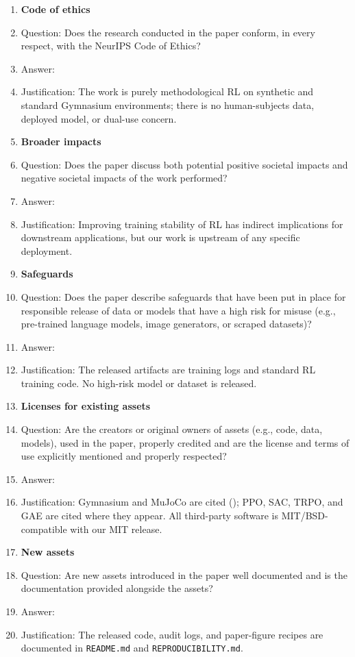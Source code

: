 \begin{enumerate}
\item {\bf Code of ethics}
    \item[] Question: Does the research conducted in the paper conform, in every respect, with the NeurIPS Code of Ethics?
    \item[] Answer: \answerYes{}
    \item[] Justification: The work is purely methodological RL on synthetic and standard Gymnasium environments; there is no human-subjects data, deployed model, or dual-use concern.

\item {\bf Broader impacts}
    \item[] Question: Does the paper discuss both potential positive societal impacts and negative societal impacts of the work performed?
    \item[] Answer: \answerNA{}
    \item[] Justification: Improving training stability of RL has indirect implications for downstream applications, but our work is upstream of any specific deployment.

\item {\bf Safeguards}
    \item[] Question: Does the paper describe safeguards that have been put in place for responsible release of data or models that have a high risk for misuse (e.g., pre-trained language models, image generators, or scraped datasets)?
    \item[] Answer: \answerNA{}
    \item[] Justification: The released artifacts are training logs and standard RL training code. No high-risk model or dataset is released.

\item {\bf Licenses for existing assets}
    \item[] Question: Are the creators or original owners of assets (e.g., code, data, models), used in the paper, properly credited and are the license and terms of use explicitly mentioned and properly respected?
    \item[] Answer: \answerYes{}
    \item[] Justification: Gymnasium and MuJoCo are cited (); PPO, SAC, TRPO, and GAE are cited where they appear. All third-party software is MIT/BSD-compatible with our MIT release.

\item {\bf New assets}
    \item[] Question: Are new assets introduced in the paper well documented and is the documentation provided alongside the assets?
    \item[] Answer: \answerYes{}
    \item[] Justification: The released code, audit logs, and paper-figure recipes are documented in \texttt{README.md} and \texttt{REPRODUCIBILITY.md}.


\end{enumerate}

